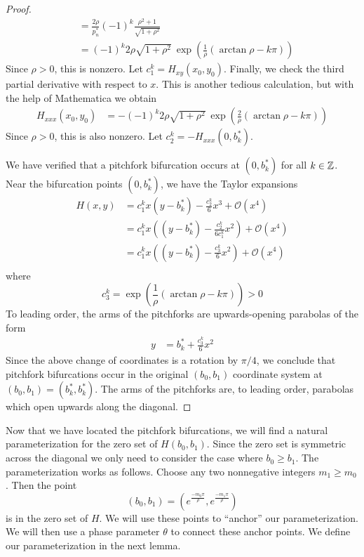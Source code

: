 \documentclass[thesis.tex]{subfiles}
\begin{document}
\begin{lemma}
\begin{proof}
\begin{align*}
&= \frac{2 \rho}{p_n^*} (-1)^k \frac{\rho^2 + 1}{\sqrt{1 + \rho^2}} \\
&= (-1)^k 2 \rho \sqrt{1 + \rho^2} \: \exp{\left(\frac{1}{\rho} (\arctan \rho - k \pi) \right)}
\end{align*}
Since $\rho > 0$, this is nonzero. Let $c_1^k = H_{xy}(x_0, y_0)$. Finally, we check the third partial derivative with respect to $x$. This is another tedious calculation, but with the help of Mathematica we obtain
\begin{align*}
H_{xxx}(x_0, y_0)
&= -(-1)^k 2 \rho \sqrt{1 + \rho^2} \: \exp{\left(\frac{2}{\rho} (\arctan \rho - k \pi) \right)}
\end{align*}
Since $\rho > 0$, this is also nonzero. Let $c_2^k = -H_{xxx}(0, b^*_k)$.

We have verified that a pitchfork bifurcation occurs at $(0, b^*_k)$ for all $k \in \mathbb{Z}$. Near the bifurcation points $(0, b_k^*)$, we have the Taylor expansions
\begin{align*}
H(x, y) &= c_1^k x (y - b_k^*) - \frac{c_2^k}{6} x^3 + \mathcal{O}(x^4) \\
&= c_1^k x \left( (y - b_k^*) - \frac{c_2^k}{6 c_1^k } x^2 \right) + \mathcal{O}(x^4) \\
&= c_1^k x \left( (y - b_k^*) - \frac{c_3^k}{6} x^2 \right) + \mathcal{O}(x^4) \\
\end{align*}
where
\begin{equation*}
c_3^k = \exp{\left(\frac{1}{\rho} (\arctan \rho - k \pi) \right)} > 0
\end{equation*}
To leading order, the arms of the pitchforks are upwards-opening parabolas of the form 
\begin{align*}
y &= b_k^* + \frac{c_3^k}{6} x^2
\end{align*}
Since the above change of coordinates is a rotation by $\pi/4$, we conclude that pitchfork bifurcations occur in the original $(b_0, b_1)$ coordinate system at $(b_0, b_1) = (b_k^*, b_k^*)$. The arms of the pitchforks are, to leading order, parabolas which open upwards along the diagonal.
\end{proof}
\end{lemma}

Now that we have located the pitchfork bifurcations, we will find a natural parameterization for the zero set of $H(b_0, b_1)$. Since the zero set is symmetric across the diagonal we only need to consider the case where $b_0 \geq b_1$. The parameterization works as follows. Choose any two nonnegative integers $m_1 \geq m_0$. Then the point
\[
(b_0, b_1) = \left( e^{\frac{-m_0 \pi}{\rho}}, e^{\frac{-m_1 \pi}{\rho}}\right)
\]
is in the zero set of $H$. We will use these points to ``anchor'' our parameterization. We will then use a phase parameter $\theta$ to connect these anchor points. We define our parameterization in the next lemma.
\end{document}
